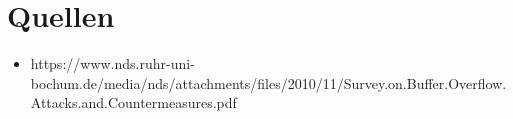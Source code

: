 \section{Quellen}
    \begin{itemize}
        \item https://www.nds.ruhr-uni-bochum.de/media/nds/attachments/files/2010/11/Survey.on.Buffer.Overflow.Attacks.and.Countermeasures.pdf
    \end{itemize}
